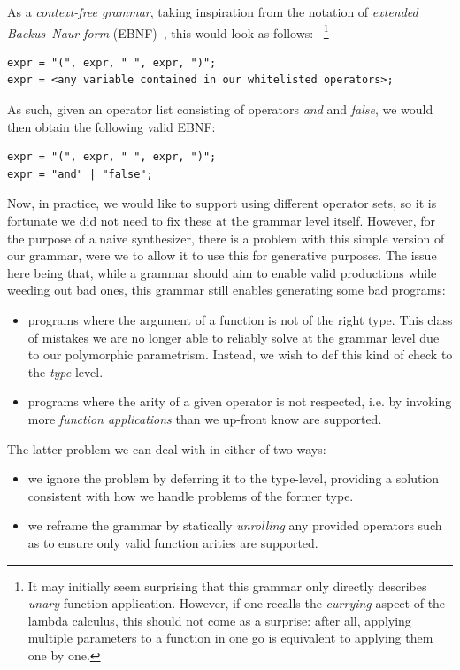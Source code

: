 \documentclass{article}
\begin{document}
As a \emph{context-free grammar},
taking inspiration from the notation of \emph{extended Backus–Naur form} (EBNF)~\citep{standard1996ebnf},
this would look as follows:%
~\footnote{
    It may initially seem surprising that this grammar only directly describes \emph{unary} function application.
    However, if one recalls the \emph{currying} aspect of the lambda calculus,
    this should not come as a surprise: after all,
    applying multiple parameters to a function in one go
    is equivalent to applying them one by one.
}

\begin{verbatim}
expr = "(", expr, " ", expr, ")";
expr = <any variable contained in our whitelisted operators>;
\end{verbatim}

As such, given an operator list consisting of operators \emph{and} and \emph{false},
we would then obtain the following valid EBNF:

\begin{verbatim}
expr = "(", expr, " ", expr, ")";
expr = "and" | "false";
\end{verbatim}


Now, in practice, we would like to support using different operator sets,
so it is fortunate we did not need to fix these at the grammar level itself.
However, for the purpose of a naive synthesizer,
there is a problem with this simple version of our grammar,
were we to allow it to use this for generative purposes.
The issue here being that,
while a grammar should aim to enable valid productions while weeding out bad ones,
this grammar still enables generating some bad programs:
\begin{itemize}
    \item programs where the argument of a function is not of the right type.
        This class of mistakes we are no longer able to reliably solve
        at the grammar level due to our polymorphic parametrism.
        Instead, we wish to def this kind of check to the \emph{type} level.
    \item programs where the arity of a given operator is not respected, i.e.
        by invoking more \emph{function applications} than we up-front know are supported.
\end{itemize}

The latter problem we can deal with in either of two ways:
\begin{itemize}
    \item we ignore the problem by deferring it to the type-level, providing a solution consistent with how we handle problems of the former type.
    \item we reframe the grammar by statically \emph{unrolling} any provided operators such as to ensure only valid function arities are supported.
\end{itemize}
\end{document}
